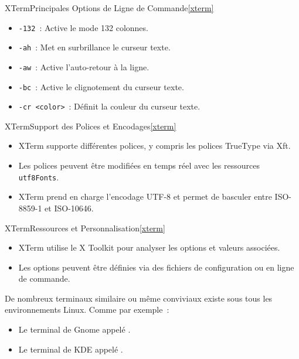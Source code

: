 \documentclass{beamer}
\begin{document}
    \begin{frame}{XTerm}{Principales Options de Ligne de Commande\cref{xterm}}
        \begin{itemize}
            \item \lstinline{-132}~: Active le mode 132 colonnes.
            \item \lstinline{-ah}~: Met en surbrillance le curseur texte.
            \item \lstinline{-aw}~: Active l'auto-retour à la ligne.
            \item \lstinline{-bc}~: Active le clignotement du curseur texte.
            \item \lstinline{-cr <color>}~: Définit la couleur du curseur texte.
        \end{itemize}
    \end{frame}

    \begin{frame}{XTerm}{Support des Polices et Encodages\cref{xterm}}
        \begin{itemize}
            \item XTerm supporte différentes polices, y compris les polices TrueType via Xft.
            \item Les polices peuvent être modifiées en temps réel avec les ressources \lstinline{utf8Fonts}.
            \item XTerm prend en charge l'encodage UTF-8 et permet de basculer entre ISO-8859-1 et ISO-10646.
        \end{itemize}
    \end{frame}

    \begin{frame}{XTerm}{Ressources et Personnalisation\cref{xterm}}
        \begin{itemize}
            \item XTerm utilise le X Toolkit pour analyser les options et valeurs associées.
            \item Les options peuvent être définies via des fichiers de configuration ou en ligne de commande.
        \end{itemize}
        \begin{dangercolorbox}
            De nombreux terminaux similaire ou même conviviaux existe sous tous les environnements Linux.
            Comme par exemple~:
            \begin{itemize}
                \item Le terminal de Gnome appelé .
                \item Le terminal de KDE appelé .
            \end{itemize}
        \end{dangercolorbox}
    \end{frame}
\end{document}
